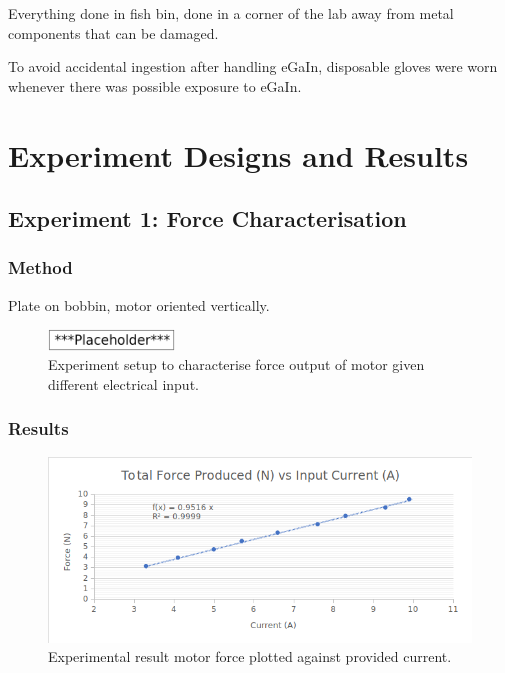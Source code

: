\documentclass[a4paper,12pt]{article}
\begin{document}
Everything done in fish bin, done in a corner of the lab away from metal components that can be damaged.

To avoid accidental ingestion after handling eGaIn, disposable gloves were worn whenever there was possible exposure to eGaIn.

\newpage

\section{Experiment Designs and Results}

\subsection{Experiment 1: Force Characterisation}

\subsubsection{Method}
Plate on bobbin, motor oriented vertically. 

\begin{figure}[h!]
	\centering
	\includegraphics[width=0.3\textwidth]{placeholder.png}
	\caption{Experiment setup to characterise force output of motor given different electrical input.}
	\label{fg:forceexperiment}
\end{figure}

\subsubsection{Results}

\begin{figure}[h!]
	\centering
	\includegraphics[width=\textwidth]{resultforcevcurrent.png}
	\caption{Experimental result motor force  plotted against provided current.}
	\label{fg:forceplot}
\end{figure}
\end{document}
